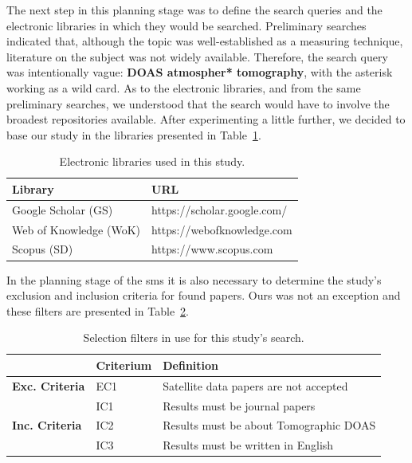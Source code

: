 The next step in this planning stage was to define the search queries
and the electronic libraries in which they would be searched.
Preliminary searches indicated that, although the topic was
well-established as a measuring technique, literature on the subject was
not widely available. Therefore, the search query was intentionally
vague: \textbf{DOAS atmospher* tomography}, with the asterisk working as
a wild card. As to the electronic libraries, and from the same
preliminary searches, we understood that the search would have to
involve the broadest repositories available. After experimenting a
little further, we decided to base our study in the libraries presented
in Table~\ref{tab:libraries_sms}.

\begin{table}[htb]
\centering
\caption{Electronic libraries used in this study.}
\label{tab:libraries_sms}
    \begin{tabularx}{\textwidth}{ll}
        \toprule
        \textbf{Library}          & \textbf{URL}\\
        \midrule
        Google Scholar (GS)   & https://scholar.google.com/\\
        Web of Knowledge (WoK)& https://webofknowledge.com\\
        Scopus (SD)   & https://www.scopus.com\\
        \bottomrule
    \end{tabularx}
\end{table}

In the planning stage of the \gls{sms} it is also necessary to determine
the study's exclusion and inclusion criteria for found papers. Ours was
not an exception and these filters are presented in
Table~\ref{tab:select_filters_sms}.

\begin{table}[htb]
\centering
\caption{Selection filters in use for this study's search.}
\label{tab:select_filters_sms}
\begin{tabularx}{\textwidth}{lXl}%
\toprule
\multicolumn{1}{l}{} & \textbf{Criterium} & \textbf{Definition} \\ \midrule
\multirow{1}{*}{\textbf{Exc. Criteria}} & EC1 & Satellite data papers
are not accepted \\
\midrule
\multicolumn{1}{l}{\multirow{3}{*}{\textbf{Inc. Criteria}}} & IC1 &
Results must be journal papers \\
\multicolumn{1}{l}{} & IC2 & Results must be about Tomographic DOAS \\ 
\multicolumn{1}{l}{} & IC3 & Results must be written in English \\
\bottomrule
\end{tabularx}
\end{table}
